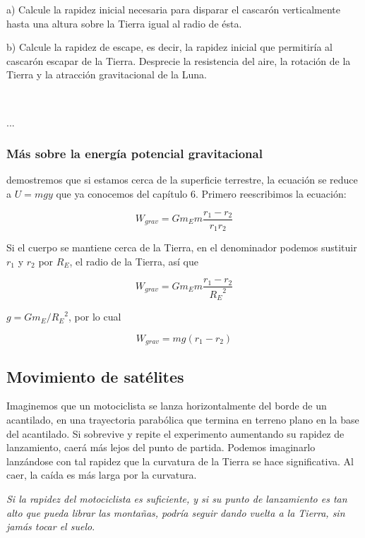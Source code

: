 \documentclass{article}
\newcommand{\newsubsection}[1]{
    \vspace{0.5cm}
    \color{sectionColor}
    \subsection{\bl{#1}}
    \color{black}
    \vspace{0.5cm}
}
\newcommand{\newtitle}[1]{
    \color{titleColor}
    \subsubsection{#1}
    \color{black}
}
\newcommand{\newex}[1]{
    \vspace{0.5cm}
    \noindent{\large \color{exerciceColor} \textbf{#1}}\\[0.2cm]
}
\newcommand{\bl}[1]{\textbf{#1}}
\begin{document}
    \begin{list}{}{}
        \item a) Calcule la rapidez inicial necesaria para disparar el cascarón verticalmente hasta una altura sobre la Tierra igual al radio de ésta.
        \item b) Calcule la rapidez de escape, es decir, la rapidez inicial que permitiría al cascarón escapar de la Tierra. Desprecie la resistencia del aire, la rotación de la Tierra y la atracción gravitacional de la Luna.
    \end{list}

    \newex{Solución 28.}

    \par ...

    \newtitle{Más sobre la energía potencial gravitacional}

    \par demostremos que si estamos cerca de la superﬁcie terrestre, la ecuación se reduce a $U = mgy$ que ya conocemos del capítulo 6. Primero reescribimos la ecuación:

    \[ W_{grav} = G m_E m \frac{r_1 - r_2}{r_1 r_2} \]

    \par Si el cuerpo se mantiene cerca de la Tierra, en el denominador podemos sustituir $r_1$ y $r_2$ por $R_E$, el radio de la Tierra, así que

    \[ W_{grav} = G m_E m \frac{r_1 - r_2}{{R_E}^2} \]

    \noindent $g = G m_E / {R_E}^2$, por lo cual

    \[ W_{grav} = m g (r_1 - r_2) \]

    \newsubsection{Movimiento de satélites}

    \par Imaginemos que un motociclista se lanza horizontalmente del borde de un acantilado, en una trayectoria parabólica que termina en terreno plano en la base del acantilado. Si sobrevive y repite el experimento aumentando su rapidez de lanzamiento, caerá más lejos del punto de partida. Podemos imaginarlo lanzándose con tal rapidez que la curvatura de la Tierra se hace signiﬁcativa. Al caer, la caída es más larga por la curvatura.

    \par \textit{Si la rapidez del motociclista es suﬁciente, y si su punto de lanzamiento es tan alto que pueda librar las montañas, podría seguir dando vuelta a la Tierra, sin jamás tocar el suelo}.
\end{document}
